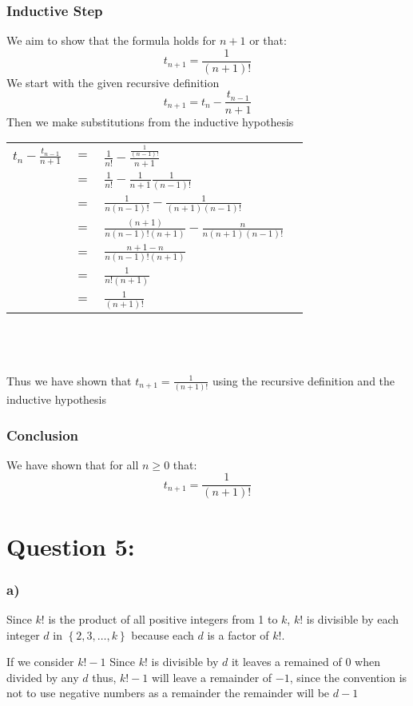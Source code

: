 \documentclass{article}
\begin{document}
\subsubsection*{Inductive Step}
We aim to show that the formula holds for $n+1$ or that: $$t_{n+1}=\frac{1}{(n+1)!}$$
We start with the given recursive definition$$t_{n+1}=t_{n}-\frac{t_{n-1}}{n+1}$$
Then we make substitutions from the inductive hypothesis
\begin{table}[htp]
\centering
\begin{tabular}{cclc}
  $t_{n}-\frac{t_{n-1}}{n+1}$ &  $=$ &  $\frac{1}{n!}-\frac{\frac{1}{(n-1)!}}{n+1}$ &   \\
   & $=$  & $\frac{1}{n!}-\frac{1}{n+1}\frac{1}{(n-1)!}$  &   \\
   & $=$  & $\frac{1}{n(n-1)!}-\frac{1}{(n+1)(n-1)!}$  &   \\
   & $=$  & $\frac{(n+1)}{n(n-1)!(n+1)}-\frac{n}{n(n+1)(n-1)!}$  &   \\
   & $=$ & $\frac{n+1-n}{n(n-1)!(n+1)}$&\\
   & $=$ & $\frac{1}{n!(n+1)}$&\\
   & $=$ & $\frac{1}{(n+1)!}$&
\end{tabular}
\end{table}
 \\\\\\
Thus we have shown that $t_{n+1}=\frac{1}{(n+1)!}$ using the recursive definition and the inductive hypothesis
\subsubsection*{Conclusion}
We have shown that for all $n\geq 0$ that: $$t_{n+1}=\frac{1}{(n+1)!}$$
\newpage
\section*{Question 5:}
\subsubsection*{a)}
Since $k!$ is the product of all positive integers from 1 to $k$, $k!$ is divisible by each integer $d$ in $\left\{ 2,3,\dots,k \right\} $
because each $d$ is a factor of $k!$. 

If we consider $k!-1$ Since $k!$ is divisible by $d$ it leaves a remained of 0 when divided by any $d$ thus, $k!-1$ will leave a remainder of $-1$, 
since the convention is not to use negative numbers as a remainder the remainder will be $d-1$
\end{document}
